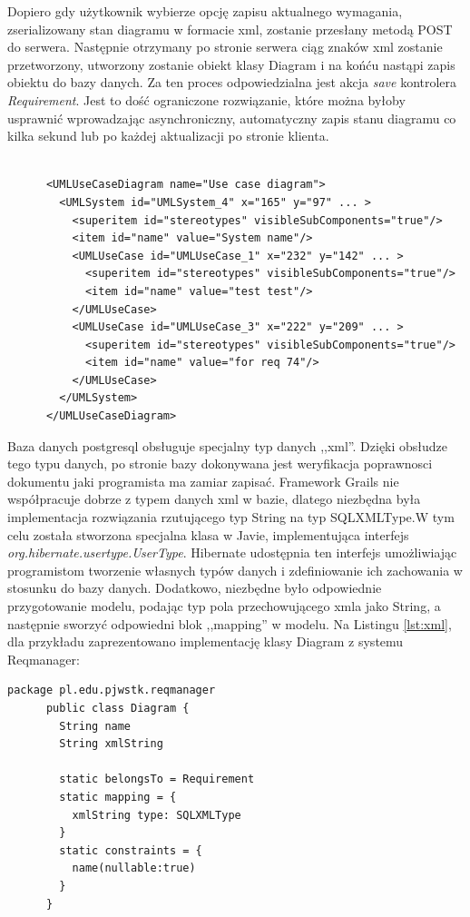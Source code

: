       Dopiero gdy użytkownik wybierze opcję zapisu aktualnego wymagania, zserializowany stan diagramu w formacie xml, zostanie przesłany metodą POST do serwera. Następnie otrzymany po stronie serwera ciąg znaków xml zostanie przetworzony, utworzony zostanie obiekt klasy Diagram i na końću nastąpi zapis obiektu do bazy danych. Za ten proces odpowiedzialna jest akcja \emph{save} kontrolera \emph{Requirement}. Jest to dość ograniczone rozwiązanie, które można byłoby usprawnić wprowadzając asynchroniczny, automatyczny zapis stanu diagramu co kilka sekund lub po każdej aktualizacji po stronie klienta.


    \begin{lstlisting}[caption={struktura xml diagramu}, label={lst:diagramXml}]

      <UMLUseCaseDiagram name="Use case diagram">
        <UMLSystem id="UMLSystem_4" x="165" y="97" ... >
          <superitem id="stereotypes" visibleSubComponents="true"/>
          <item id="name" value="System name"/>
          <UMLUseCase id="UMLUseCase_1" x="232" y="142" ... >
            <superitem id="stereotypes" visibleSubComponents="true"/>
            <item id="name" value="test test"/>
          </UMLUseCase>
          <UMLUseCase id="UMLUseCase_3" x="222" y="209" ... >
            <superitem id="stereotypes" visibleSubComponents="true"/>
            <item id="name" value="for req 74"/>
          </UMLUseCase>
        </UMLSystem>
      </UMLUseCaseDiagram>

    \end{lstlisting}

      Baza danych postgresql obsługuje specjalny typ danych ,,xml''. Dzięki obsłudze tego typu danych, po stronie bazy dokonywana jest weryfikacja poprawnosci dokumentu jaki programista ma zamiar zapisać. Framework Grails nie współpracuje dobrze z typem danych xml w bazie, dlatego niezbędna była implementacja rozwiązania rzutującego typ String na typ SQLXMLType.W tym celu została stworzona specjalna klasa w Javie, implementująca interfejs \emph{org.hibernate.usertype.UserType}. Hibernate udostępnia ten interfejs umożliwiając programistom tworzenie własnych typów danych i zdefiniowanie ich zachowania w stosunku do bazy danych. Dodatkowo, niezbędne było odpowiednie przygotowanie modelu, podając typ pola przechowującego xmla jako String, a następnie sworzyć odpowiedni blok ,,mapping'' w modelu. Na Listingu \ref{lst:xml}, dla przykładu zaprezentowano implementację klasy Diagram z systemu Reqmanager:

      \begin{lstlisting}[caption={implementacja modelu Diagram}, label={lst:xml}]
      package pl.edu.pjwstk.reqmanager
      public class Diagram {
        String name
        String xmlString

        static belongsTo = Requirement
        static mapping = {
          xmlString type: SQLXMLType
        }
        static constraints = {
          name(nullable:true)
        }
      }
      \end{lstlisting}
      
